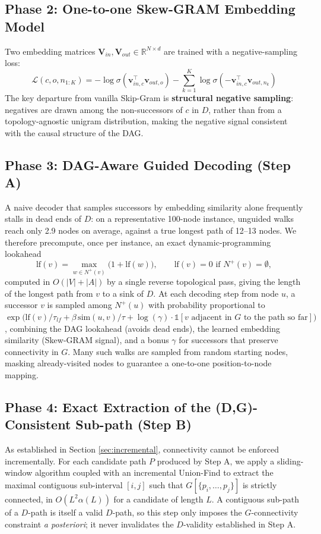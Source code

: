 \documentclass{llncs}
\begin{document}
\subsection{Phase 2: One-to-one Skew-GRAM Embedding Model}
Two embedding matrices $\mathbf{V}_{in}, \mathbf{V}_{out} \in \mathbb{R}^{N \times d}$ are trained with a negative-sampling loss:
\begin{equation}
\mathcal{L}(c,o,n_{1:K}) = -\log\sigma(\mathbf v_{in,c}^\top \mathbf v_{out,o}) - \sum_{k=1}^K \log\sigma(-\mathbf v_{in,c}^\top \mathbf v_{out,n_k})
\end{equation}
The key departure from vanilla Skip-Gram is \textbf{structural negative sampling}: negatives are drawn among the non-successors of $c$ in $D$, rather than from a topology-agnostic unigram distribution, making the negative signal consistent with the causal structure of the DAG.

\subsection{Phase 3: DAG-Aware Guided Decoding (Step A)}
A naive decoder that samples successors by embedding similarity alone frequently stalls in dead ends of $D$: on a representative 100-node instance, unguided walks reach only 2.9 nodes on average, against a true longest path of 12--13 nodes. We therefore precompute, once per instance, an exact dynamic-programming lookahead
\begin{equation}
\mathrm{lf}(v) = \max_{w \in N^+(v)} \big(1 + \mathrm{lf}(w)\big), \qquad \mathrm{lf}(v)=0 \text{ if } N^+(v)=\emptyset,
\end{equation}
computed in $O(|V|+|A|)$ by a single reverse topological pass, giving the length of the longest path from $v$ to a sink of $D$. At each decoding step from node $u$, a successor $v$ is sampled among $N^+(u)$ with probability proportional to $\exp\!\big(\mathrm{lf}(v)/\tau_{lf} + \beta\,\mathrm{sim}(u,v)/\tau + \log(\gamma)\cdot\mathbb{1}[v \text{ adjacent in } G \text{ to the path so far}]\big)$, combining the DAG lookahead (avoids dead ends), the learned embedding similarity (Skew-GRAM signal), and a bonus $\gamma$ for successors that preserve connectivity in $G$. Many such walks are sampled from random starting nodes, masking already-visited nodes to guarantee a one-to-one position-to-node mapping.

\subsection{Phase 4: Exact Extraction of the (D,G)-Consistent Sub-path (Step B)}
As established in Section \ref{sec:incremental}, connectivity cannot be enforced incrementally. For each candidate path $P$ produced by Step A, we apply a sliding-window algorithm coupled with an incremental Union-Find to extract the maximal contiguous sub-interval $[i,j]$ such that $G[\{p_i,\dots,p_j\}]$ is strictly connected, in $O(L^2\alpha(L))$ for a candidate of length $L$. A contiguous sub-path of a $D$-path is itself a valid $D$-path, so this step only imposes the $G$-connectivity constraint \emph{a posteriori}; it never invalidates the $D$-validity established in Step A.
\end{document}
